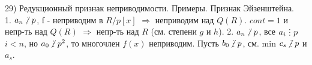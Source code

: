 29) Редукционный признак неприводимости. Примеры. Признак Эйзенштейна.\\
1. $a_n \ndi p$, f - неприводим в $R/p[x]$ $\Rightarrow$ неприводим над $Q(R)$. $cont = 1$ и непр-ть над $Q(R)$ $\Rightarrow$ непр-ть над $R$ (см. степени $g$ и $h$). 2. $a_n \ndi p$, все $a_i \di p$ $i<n$, но $a_0\ndi p^2$, то многочлен $f(x)$ неприводим. Пусть $b_0 \ndi p$, см. min $c_s \ndi p$ и $a_s$.\\

